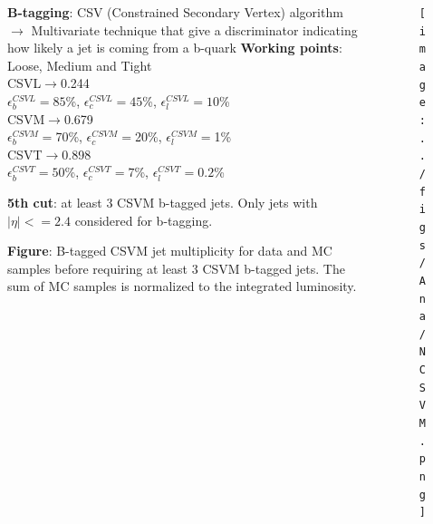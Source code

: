 \begin{frame}{}
\vspace{-.2cm}

\begin{columns}
\begin{column}{.50\textwidth}
\begin{block}{}
\scriptsize \textbf{B-tagging}: CSV (Constrained Secondary Vertex) algorithm $\to$ Multivariate technique that give a discriminator indicating how likely a jet is coming from a b-quark
\textbf{Working points}: Loose, Medium and Tight\\\tiny{CSVL$\to$0.244 \\$\epsilon^{CSVL}_{b}=85$\%, $\epsilon^{CSVL}_{c}=45$\%, $\epsilon^{CSVL}_{l}=10$\% \\CSVM$\to$0.679\\ $\epsilon^{CSVM}_{b}=$70\%, $\epsilon^{CSVM}_{c}=$20\%, $\epsilon^{CSVM}_{l}=$1\% \\CSVT$\to$0.898\\ $\epsilon^{CSVT}_{b}=50$\%, $\epsilon^{CSVT}_{c}=7$\%, $\epsilon^{CSVT}_{l}=0.2$\%}
\end{block}
\vspace{-.2cm}
\begin{block}{}
\scriptsize \textbf{5th cut}: at least 3 CSVM b-tagged jets. Only jets with $|\eta|<=2.4$ considered for b-tagging.
\end{block}
\vspace{-.2cm}
\begin{block}{}
\scriptsize \textbf{Figure}: B-tagged CSVM jet multiplicity for data and MC samples before requiring at least 3 CSVM b-tagged jets. The sum of MC samples is normalized to the integrated luminosity.
\end{block}
\end{column}

\begin{column}{.50\textwidth}
\begin{figure}[!Hhtbp]
  \begin{center}
    \texttt{[image: ../figs/Ana/NCSVM.png]}
  \end{center}
\end{figure}
\end{column}

\end{columns}
\end{frame}



